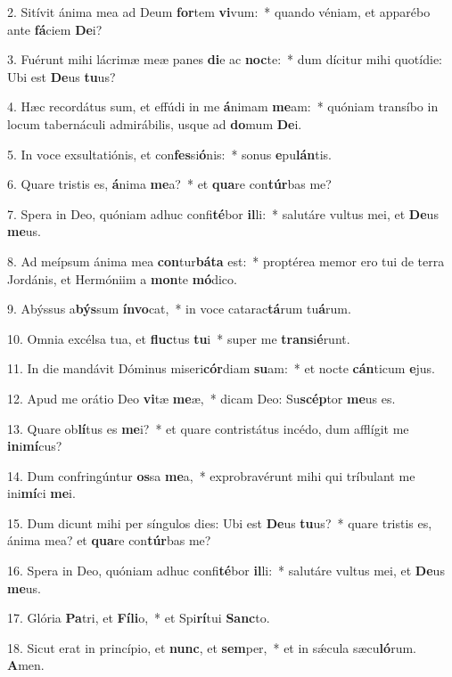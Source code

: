 2. Sitívit ánima mea ad Deum \textbf{for}tem \textbf{vi}vum:~*  quando véniam, et apparébo ante \textbf{fá}ciem \textbf{De}i?\

3. Fuérunt mihi lácrimæ meæ panes \textbf{di}e ac \textbf{noc}te:~*  dum dícitur mihi quotídie: Ubi est \textbf{De}us \textbf{tu}us?\

4. Hæc recordátus sum, et effúdi in me \textbf{á}nimam \textbf{me}am:~*  quóniam transíbo in locum tabernáculi admirábilis, usque ad \textbf{do}mum \textbf{De}i.\

5. In voce exsultatiónis, et con\textbf{fes}si\textbf{ó}nis:~*  sonus \textbf{e}pu\textbf{lán}tis.\

6. Quare tristis es, \textbf{á}nima \textbf{me}a?~*  et \textbf{qua}re con\textbf{túr}bas me?\

7. Spera in Deo, quóniam adhuc confi\textbf{té}bor \textbf{il}li:~*  salutáre vultus mei, et \textbf{De}us \textbf{me}us.\

8. Ad meípsum ánima mea \textbf{con}tur\textbf{bá}\textbf{ta} est:~*  proptérea memor ero tui de terra Jordánis, et Hermóniim a \textbf{mon}te \textbf{mó}dico.\

9. Abýssus a\textbf{býs}sum \textbf{ín}\textbf{vo}cat,~*  in voce catarac\textbf{tá}rum tu\textbf{á}rum.\

10. Omnia excélsa tua, et \textbf{fluc}tus \textbf{tu}i~*  super me \textbf{trans}i\textbf{é}runt.\

11. In die mandávit Dóminus miseri\textbf{cór}diam \textbf{su}am:~*  et nocte \textbf{cán}ticum \textbf{e}jus.\

12. Apud me orátio Deo \textbf{vi}tæ \textbf{me}æ,~*  dicam Deo: Su\textbf{scép}tor \textbf{me}us es.\

13. Quare ob\textbf{lí}tus es \textbf{me}i?~*  et quare contristátus incédo, dum afflígit me \textbf{in}i\textbf{mí}cus?\

14. Dum confringúntur \textbf{os}sa \textbf{me}a,~*  exprobravérunt mihi qui tríbulant me ini\textbf{mí}ci \textbf{me}i.\

15. Dum dicunt mihi per síngulos dies: Ubi est \textbf{De}us \textbf{tu}us?~*  quare tristis es, ánima mea? et \textbf{qua}re con\textbf{túr}bas me?\

16. Spera in Deo, quóniam adhuc confi\textbf{té}bor \textbf{il}li:~*  salutáre vultus mei, et \textbf{De}us \textbf{me}us.\

17. Glória \textbf{Pa}tri, et \textbf{Fí}\textbf{li}o,~*  et Spi\textbf{rí}tui \textbf{Sanc}to.\

18. Sicut erat in princípio, et \textbf{nunc}, et \textbf{sem}per,~*  et in sǽcula sæcu\textbf{ló}rum. \textbf{A}men.\

